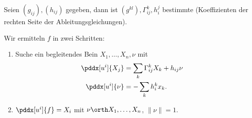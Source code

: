 Seien $(g_{ij}), (h_{ij})$ gegeben, dann ist $(g^{kl}), \Gamma_{ij}^k, h_i^j$ bestimmte (Koeffizienten der rechten Seite der Ableitungsgleichungen).

Wir ermitteln $f$ in zwei Schritten:
\begin{enumerate}[1.]
	\item
		Suche ein begleitendes Bein $X_1, \dotsc, X_n, \nu$ mit
		\begin{align*}
			\pddx[u^i]{X_j} &= \sum_k \Gamma_{ij}^k X_k + h_{ij} \nu \\
			\pddx[u^i]{\nu} &= -\sum_k h_i^k x_k.
		\end{align*}
	\item
		$\pddx[u^i]{f} = X_i$ mit $\nu \orth X_1, \dotsc, X_n$, $\|\nu \| = 1$.
\end{enumerate}

